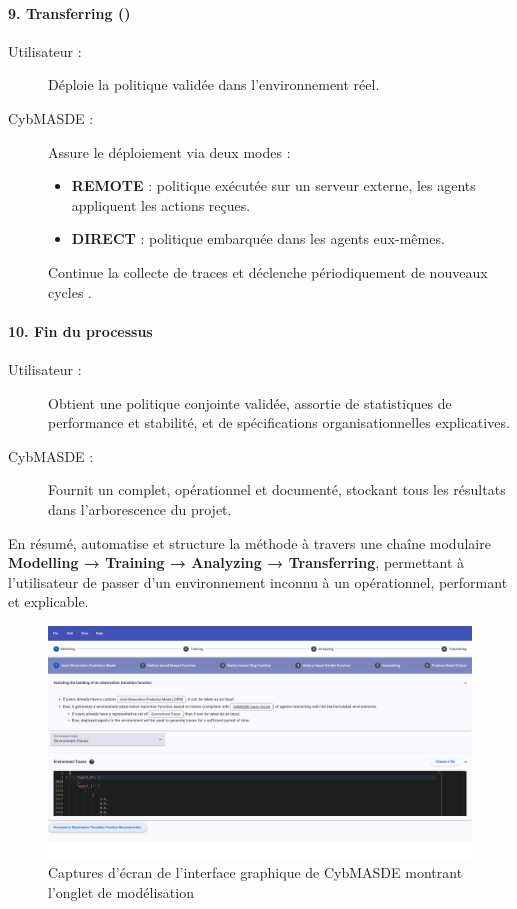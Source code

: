 \paragraph{9. Transferring ()}
\begin{description}
  \item[Utilisateur :] Déploie la politique validée dans l’environnement réel.
  \item[CybMASDE :] Assure le déploiement via deux modes :
    \begin{itemize}
      \item \textbf{REMOTE} : politique exécutée sur un serveur externe, les agents appliquent les actions reçues.
      \item \textbf{DIRECT} : politique embarquée dans les agents eux-mêmes.
    \end{itemize}
    Continue la collecte de traces et déclenche périodiquement de nouveaux cycles .
\end{description}

\paragraph{10. Fin du processus}
\begin{description}
  \item[Utilisateur :] Obtient une politique conjointe validée, assortie de statistiques de performance et stabilité, et de spécifications organisationnelles explicatives.
  \item[CybMASDE :] Fournit un  complet, opérationnel et documenté, stockant tous les résultats dans l’arborescence du projet.
\end{description}

\medskip
En résumé,  automatise et structure la méthode  à travers une chaîne modulaire \textbf{Modelling → Training → Analyzing → Transferring}, permettant à l’utilisateur de passer d’un environnement inconnu à un  opérationnel, performant et explicable.


\begin{figure}
  \centering
  \includegraphics[width=\linewidth]{figures/CybMASDE_2.png}
  \caption{Captures d'écran de l'interface graphique de CybMASDE montrant l'onglet de modélisation}
  \label{fig:cybmasde_screenshot}
\end{figure}


